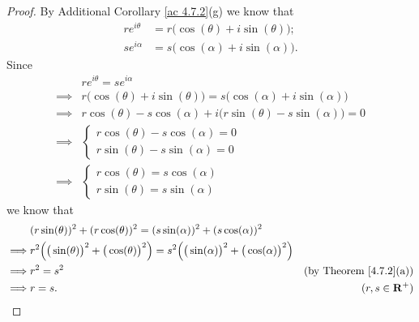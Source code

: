 \begin{proof}
    By Additional Corollary \ref{ac 4.7.2}(g) we know that
    \begin{align*}
        r e^{i \theta} & = r \big(\cos(\theta) + i \sin(\theta)\big); \\
        s e^{i \alpha} & = s \big(\cos(\alpha) + i \sin(\alpha)\big).
    \end{align*}
    Since
    \begin{align*}
                 & r e^{i \theta} = s e^{i \alpha}                                                       \\
        \implies & r \big(\cos(\theta) + i \sin(\theta)\big) = s \big(\cos(\alpha) + i \sin(\alpha)\big) \\
        \implies & r \cos(\theta) - s \cos(\alpha) + i \big(r \sin(\theta) - s \sin(\alpha)\big) = 0     \\
        \implies & \begin{cases}
                       r \cos(\theta) - s \cos(\alpha) = 0 \\
                       r \sin(\theta) - s \sin(\alpha) = 0
                   \end{cases}                                                   \\
        \implies & \begin{cases}
                       r \cos(\theta) = s \cos(\alpha) \\
                       r \sin(\theta) = s \sin(\alpha)
                   \end{cases}
    \end{align*}
    we know that
    \begin{align*}
                 & (r \sin(\theta))^2 + (r \cos(\theta))^2 = (s \sin(\alpha))^2 + (s \cos(\alpha))^2                                                                                          \\
        \implies & r^2 \Big(\big(\sin(\theta)\big)^2 + \big(\cos(\theta)\big)^2\Big) = s^2 \Big(\big(\sin(\alpha)\big)^2 + \big(\cos(\alpha)\big)^2\Big)                                      \\
        \implies & r^2 = s^2                                                                                                                             & \text{(by Theorem \ref{4.7.2}(a))} \\
        \implies & r = s.                                                                                                                                & (r, s \in \R^+)

\end{align*}
\end{proof}
